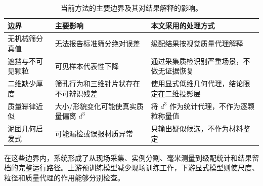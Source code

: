 \begin{table}[H]
\centering
\caption{当前方法的主要边界及其对结果解释的影响。}
\label{tab:r-final-limits}
\footnotesize
\renewcommand{\arraystretch}{1.1}
\begin{tabular}{>{\raggedright\arraybackslash}p{3.2cm}>{\raggedright\arraybackslash}p{4.5cm}>{\raggedright\arraybackslash}p{5.3cm}}
\toprule
边界 & 主要影响 & 本文采用的处理方式 \\
\midrule
无机械筛分真值 & 无法报告标准筛分绝对误差 & 级配结果按视觉质量代理解释 \\
遮挡与不可见颗粒 & 可见样本代表性下降 & 通过采集质检识别严重场景，不做无证据恢复 \\
二维缺少厚度 & 筛孔行为和三维针片状存在不可辨识残差 & 使用显式低维几何代理，结论限定在二维投影层 \\
质量幂律近似 & 大小/形貌变化可能使真实质量偏离 $d^3$ & 将 $d^3$ 作为统计代理，不作为逐颗粒称量值 \\
泥团几何启发式 & 可能漏检或误报材质异常 & 只输出疑似候选，不作为材料鉴定 \\
\bottomrule
\end{tabular}
\end{table}

在这些边界内，系统形成了从现场采集、实例分割、毫米测量到级配统计和结果留档的完整运行路径。上游预训练模型减少现场训练工作，下游显式模型则使尺度、粒径和质量代理的作用能够分别检查。